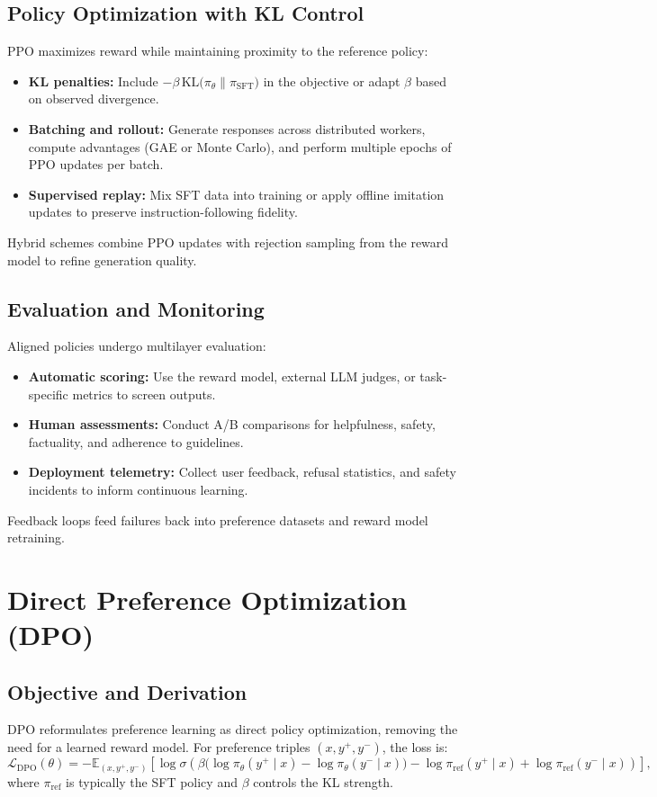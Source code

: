\documentclass{article}
\begin{document}
\subsection{Policy Optimization with KL Control}
PPO maximizes reward while maintaining proximity to the reference policy:
\begin{itemize}
  \item \textbf{KL penalties:} Include $-\beta \, \mathrm{KL}\big(\pi_\theta \| \pi_{\mathrm{SFT}}\big)$ in the objective or adapt $\beta$ based on observed divergence.
  \item \textbf{Batching and rollout:} Generate responses across distributed workers, compute advantages (GAE or Monte Carlo), and perform multiple epochs of PPO updates per batch.
  \item \textbf{Supervised replay:} Mix SFT data into training or apply offline imitation updates to preserve instruction-following fidelity.
\end{itemize}
Hybrid schemes combine PPO updates with rejection sampling from the reward model to refine generation quality.

\subsection{Evaluation and Monitoring}
Aligned policies undergo multilayer evaluation:
\begin{itemize}
  \item \textbf{Automatic scoring:} Use the reward model, external LLM judges, or task-specific metrics to screen outputs.
  \item \textbf{Human assessments:} Conduct A/B comparisons for helpfulness, safety, factuality, and adherence to guidelines.
  \item \textbf{Deployment telemetry:} Collect user feedback, refusal statistics, and safety incidents to inform continuous learning.
\end{itemize}
Feedback loops feed failures back into preference datasets and reward model retraining.

\section{Direct Preference Optimization (DPO)}
\subsection{Objective and Derivation}
DPO reformulates preference learning as direct policy optimization, removing the need for a learned reward model. For preference triples $(x, y^+, y^-)$, the loss is:
\begin{equation}
  \mathcal{L}_{\text{DPO}}(\theta) = - \mathbb{E}_{(x, y^+, y^-)} \left[ \log \sigma\left(\beta \big(\log \pi_\theta(y^+ \mid x) - \log \pi_\theta(y^- \mid x)\big) - \log \pi_{\text{ref}}(y^+ \mid x) + \log \pi_{\text{ref}}(y^- \mid x) \right) \right],
\end{equation}
where $\pi_{\text{ref}}$ is typically the SFT policy and $\beta$ controls the KL strength.
\end{document}
